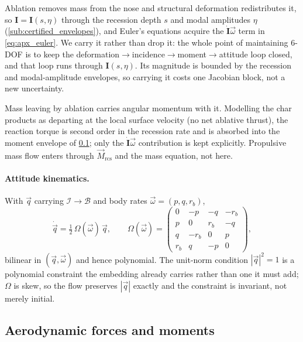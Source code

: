\begin{remark}
Ablation removes mass from the nose and structural deformation
redistributes it, so $\mathbf I=\mathbf I(s,\eta)$ through the recession depth
$s$ and modal amplitudes $\eta$ (\cref{sub:certified_envelopes}), and
Euler's equations acquire the $\dot{\mathbf I}\vec\omega$ term in
\cref{eq:apx_euler}.
We carry it rather than drop it: the whole point of maintaining $6$-DOF is to 
keep the deformation$\to$incidence$\to$moment$\to$attitude
loop closed, and that loop runs through $\mathbf I(s,\eta)$. Its magnitude is
bounded by the recession and modal-amplitude envelopes, so carrying it costs
one Jacobian block, not a new uncertainty.
\end{remark}

\begin{remark}
Mass leaving by ablation carries angular momentum with it. Modelling the
char products as departing at the local surface velocity (no net ablative
thrust), the reaction torque is second order in the recession rate and is
absorbed into the moment envelope of \cref{sub:apx_aero}; only the
$\dot{\mathbf I}\vec\omega$ contribution is kept explicitly. Propulsive
mass flow enters through $\vec M_{\mathrm{rcs}}$ and the mass equation, not
here.
\end{remark}

\paragraph{Attitude kinematics.} With $\vec q$ carrying $\mathcal I\to\mathcal B$
and body rates $\vec\omega=(p,q,r_{\!b})$,
\begin{equation}
\label{eq:apx_qkin}
\dot{\vec q}=\tfrac12\,\Omega(\vec\omega)\,\vec q,\qquad
\Omega(\vec\omega)=
\begin{pmatrix}
0 & -p & -q & -r_{\!b}\\
p & 0 & r_{\!b} & -q\\
q & -r_{\!b} & 0 & p\\
r_{\!b} & q & -p & 0
\end{pmatrix},
\end{equation}
bilinear in $(\vec q,\vec\omega)$ and hence polynomial. The unit-norm
condition $|\vec q|^2=1$ is a polynomial constraint the embedding already
carries rather than one it must add; $\Omega$ is skew, so the flow preserves
$|\vec q|$ exactly and the constraint is invariant, not merely initial.

\subsection{Aerodynamic forces and moments}
\label{sub:apx_aero}

